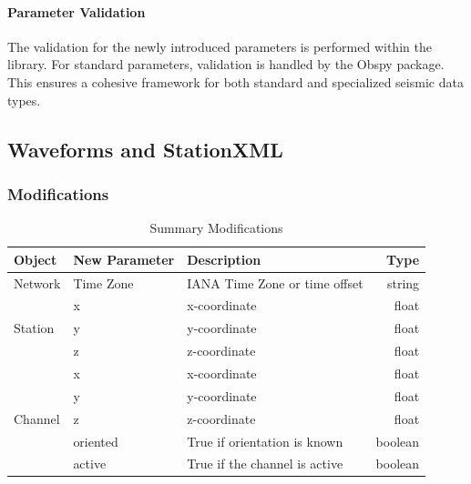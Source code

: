 \paragraph{Parameter Validation}
The validation for the newly introduced parameters is performed within the \muquake library. For standard parameters, validation is handled by the Obspy package. This ensures a cohesive framework for both standard and specialized seismic data types.


\subsection{Waveforms and StationXML}

\subsubsection{Modifications}

\begin{table}[!h]
\centering
\caption{Summary Modifications}
\begin{tabular}{lllr}
\hline
\textbf{Object} & \textbf{New Parameter} & \textbf{Description} & \textbf{Type} \\
\hline
\multirow{1}{*}{Network} & Time Zone & IANA Time Zone or time offset & string \\
\hline
\multirow{3}{*}{Station} & x & x-coordinate & float \\
                         & y & y-coordinate & float \\
                         & z & z-coordinate & float \\
\hline
\multirow{5}{*}{Channel} & x & x-coordinate & float \\
                         & y & y-coordinate & float \\
                         & z & z-coordinate & float \\
                         & oriented & True if orientation is known & boolean \\
                         & active & True if the channel is active & boolean \\
\hline
\end{tabular}
\end{table}

